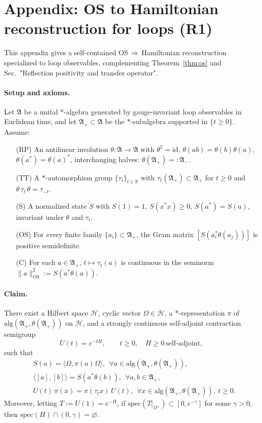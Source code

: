 \documentclass[11pt]{amsart}
\begin{document}
\section{Appendix: OS to Hamiltonian reconstruction for loops (R1)}

This appendix gives a self-contained OS\,$\Rightarrow$\,Hamiltonian reconstruction specialized to loop observables, complementing Theorem~\ref{thm:os} and Sec.~"Reflection positivity and transfer operator".

\paragraph{Setup and axioms.}
Let $\mathfrak A$ be a unital $*$-algebra generated by gauge-invariant loop observables in Euclidean time, and let $\mathfrak A_+\subset\mathfrak A$ be the $*$-subalgebra supported in $\{t\ge 0\}$. Assume:
\begin{itemize}
\item[(RP)] An antilinear involution $\theta:\mathfrak A\to\mathfrak A$ with $\theta^2=\mathrm{id}$, $\theta(ab)=\theta(b)\theta(a)$, $\theta(a^*)=\theta(a)^*$, interchanging halves: $\theta(\mathfrak A_+)=:\mathfrak A_-.$
\item[(TT)] A $*$-automorphism group $\{\tau_t\}_{t\in\mathbb R}$ with $\tau_t(\mathfrak A_+)\subset\mathfrak A_+$ for $t\ge 0$ and $\theta\,\tau_t\,\theta=\tau_{-t}$.
\item[(S)] A normalized state $S$ with $S(1)=1$, $S(x^*x)\ge 0$, $S(a^*)=\overline{S(a)}$, invariant under $\theta$ and $\tau_t$.
\item[(OS)] For every finite family $\{a_i\}\subset\mathfrak A_+$, the Gram matrix $[S(a_i^*\theta(a_j))]$ is positive semidefinite.
\item[(C)] For each $a\in\mathfrak A_+$, $t\mapsto\tau_t(a)$ is continuous in the seminorm $\|a\|_{\mathrm{OS}}^2:=S(a^*\theta(a))$.
\end{itemize}

\paragraph{Claim.}
There exist a Hilbert space $\mathcal H$, cyclic vector $\Omega\in\mathcal H$, a $*$-representation $\pi$ of $\mathrm{alg}(\mathfrak A_+,\theta(\mathfrak A_+))$ on $\mathcal H$, and a strongly continuous self-adjoint contraction semigroup
\[
  U(t)=e^{-tH},\qquad t\ge 0,\quad H\ge 0\ \text{self-adjoint},
\]
such that
\begin{align}
&S(a)=\langle\Omega,\pi(a)\Omega\rangle,\ \ \forall a\in \mathrm{alg}(\mathfrak A_+,\theta(\mathfrak A_+)), \\[-4pt]
&\langle[a],[b]\rangle= S(a^*\theta(b)),\ \ \forall a,b\in\mathfrak A_+, \\
&U(t)\,\pi(x)=\pi(\tau_t x)\,U(t),\ \ \forall x\in \mathrm{alg}(\mathfrak A_+,\theta(\mathfrak A_+)),\ t\ge 0.
\end{align}
Moreover, letting $T:=U(1)=e^{-H}$, if $\mathrm{spec}(T|_{\Omega^\perp})\subset[0,e^{-\gamma}]$ for some $\gamma>0$, then $\mathrm{spec}(H)\cap(0,\gamma)=\varnothing$.
\end{document}
